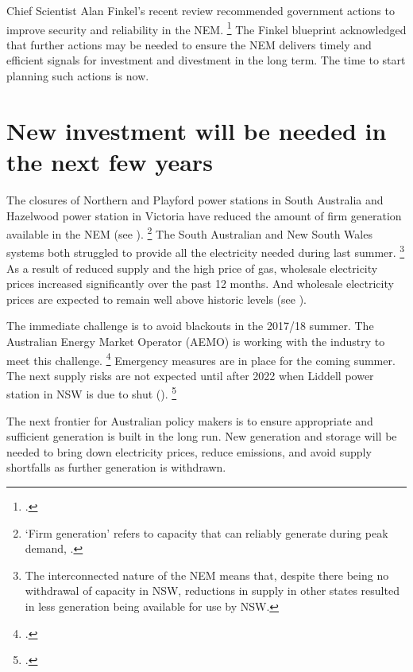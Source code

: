 \documentclass[FrontPage]{grattan}
\begin{document}
Chief Scientist Alan Finkel's recent review recommended government actions to improve security and reliability in the NEM\@.%
\footcite[][]{Finkel2017ReviewFinal}
The Finkel blueprint acknowledged that further actions may be needed to ensure the NEM delivers timely and efficient signals for investment and divestment in the long term. The time to start planning such actions is now.

\section{New investment will be needed in the next few years}\label{sec:new-investment-will-be-needed}
The closures of Northern and Playford power stations in South Australia and Hazelwood power station in Victoria have reduced the amount of firm generation available in the NEM (see ).%
\footnote{`Firm generation' refers to capacity that can reliably generate during peak demand, \textcite{AEMO2016ModellingMethodology}.}
The South Australian and New South Wales systems both struggled to provide all the electricity needed during last summer.%
\footnote{The interconnected nature of the NEM means that, despite there being no withdrawal of capacity in NSW, reductions in supply in other states resulted in less generation being available for use by NSW\@.}
As a result of reduced supply and the high price of gas, wholesale electricity prices increased significantly over the past 12 months. And wholesale electricity prices are expected to remain well above historic levels (see ).

The immediate challenge is to avoid blackouts in the 2017/18 summer. The Australian Energy Market Operator (AEMO) is working with the industry to meet this challenge.%
\footcite{AEMO2017ESO}
Emergency measures are in place for the coming summer. The next supply risks are not expected until after 2022 when Liddell power station in NSW is due to shut ().%
\footcites{AEMO2017ESOO}{AEMO2017ESO}

The next frontier for Australian policy makers is to ensure appropriate and sufficient generation is built in the long run. New generation and storage will be needed to bring down electricity prices, reduce emissions, and avoid supply shortfalls as further generation is withdrawn.
\end{document}
